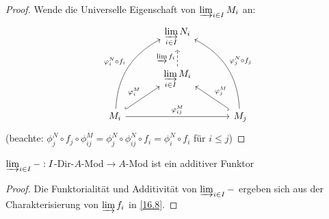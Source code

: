 \begin{proof}
	Wende die Universelle Eigenschaft von $\varinjlim_{i\in I} M_i$ an:
	$$\begin{tikzcd}[column sep = large]
	& \varinjlim\limits_{i\in I} N_i & \\
	& \varinjlim\limits_{i\in I} M_i \arrow[dashed]{u}{\varinjlim f_i}& \\
	M_i \arrow[hook]{ur}{\phi_i^M} \arrow[bend left]{uur}{\phi_i^N \circ f_i} \arrow{rr}{\phi_{ij}^M} & & M_j \arrow[swap, hook]{ul}{\phi_j^M} \arrow[bend right, swap]{uul}{\phi_j^N \circ f_j}
	\end{tikzcd}$$
	(beachte: $\phi_j^N \circ f_j \circ \phi_{ij}^M = \phi_j^N \circ \phi_{ij}^N \circ f_i = \phi_i^N \circ f_i$ für $i\leq j$)
\end{proof}
\begin{fo}
	$\varinjlim_{i\in I}-:I$-Dir-$A$-Mod$\to A$-Mod ist ein additiver Funktor
\end{fo}
\begin{proof}
	Die Funktorialität und Additivität von $\varinjlim_{i\in I}-$ ergeben sich aus der Charakterisierung von $\varinjlim f_i$ in \ref{16.8}.
\end{proof}